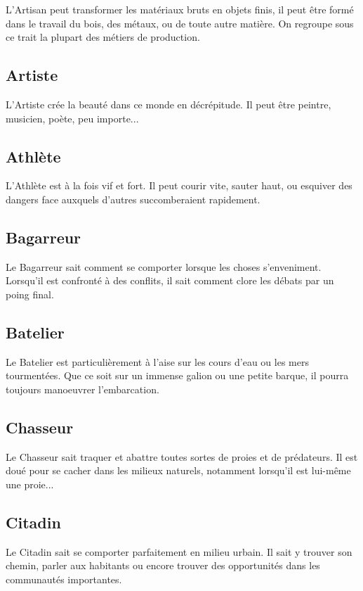 \documentclass[twoside,12pt,english]{book}
\begin{document}
L'Artisan peut transformer les matériaux bruts en objets finis, il peut être formé dans le travail du bois, des métaux, ou de toute autre matière. On regroupe sous ce trait la plupart des métiers de production.

\subsection*{Artiste}

L'Artiste crée la beauté dans ce monde en décrépitude. Il peut être peintre, musicien, poète, peu importe...

\subsection*{Athlète}

L'Athlète est à la fois vif et fort. Il peut courir vite, sauter haut, ou esquiver des dangers face auxquels d'autres succomberaient rapidement.

\subsection*{Bagarreur}

Le Bagarreur sait comment se comporter lorsque les choses s'enveniment. Lorsqu'il est confronté à des conflits, il sait comment clore les débats par un poing final.

\subsection*{Batelier}

Le Batelier est particulièrement à l'aise sur les cours d'eau ou les mers tourmentées. Que ce soit sur un immense galion ou une petite barque, il pourra toujours manoeuvrer l'embarcation.

\subsection*{Chasseur}

Le Chasseur sait traquer et abattre toutes sortes de proies et de prédateurs. Il est doué pour se cacher dans les milieux naturels, notamment lorsqu'il est lui-même une proie...

\subsection*{Citadin}

Le Citadin sait se comporter parfaitement en milieu urbain. Il sait y trouver son chemin, parler aux habitants ou encore trouver des opportunités dans les communautés importantes.
\end{document}
